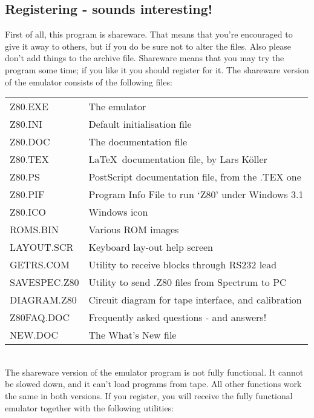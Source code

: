 \subsection{Registering - sounds interesting!}

    First of all, this program is shareware.  That means that you're
    encouraged to give it away to others, but if you do be sure not to alter
    the files.  Also please don't add things to the archive file. Shareware
    means that you may try the program some time; if you like it you should
    register for it.
\noindent
    The shareware version of the emulator consists of the following files:\\

\begin{tabular}{l@{ -- }l}
        Z80.EXE      & The emulator \\
        Z80.INI      & Default initialisation file \\
        Z80.DOC      & The documentation file \\
        Z80.TEX      & \LaTeX~documentation file, by Lars K\"oller \\
        Z80.PS       & PostScript documentation file, from the .TEX one \\
        Z80.PIF      & Program Info File to run `Z80' under Windows 3.1 \\
        Z80.ICO      & Windows icon \\
        ROMS.BIN     & Various ROM images \\
        LAYOUT.SCR   & Keyboard lay-out help screen \\
        GETRS.COM    & Utility to receive blocks through RS232 lead \\
        SAVESPEC.Z80 & Utility to send .Z80 files from Spectrum to PC \\
        DIAGRAM.Z80  & Circuit diagram for tape interface, and calibration \\
        Z80FAQ.DOC   & Frequently asked questions - and answers! \\
        NEW.DOC      & The What's New file \\
\end{tabular}\\

\noindent
    The shareware version of the emulator program is not fully functional.
    It cannot be slowed down, and it can't load programs from tape.  All
    other functions work the same in both versions.  If you register, you
    will receive the fully functional emulator together with the following
    utilities:\\

